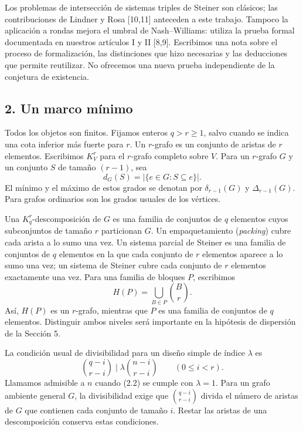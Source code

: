 \documentclass[spanish,11pt,a4paper]{article}
\begin{document}
Los problemas de intersección de sistemas triples de Steiner son clásicos; las contribuciones de Lindner y Rosa {[}10,11{]} anteceden a este trabajo. Tampoco la aplicación a rondas mejora el umbral de Nash--Williams: utiliza la prueba formal documentada en nuestros artículos I y II {[}8,9{]}. Escribimos una nota sobre el proceso de formalización, las distinciones que hizo necesarias y las deducciones que permite reutilizar. No ofrecemos una nueva prueba independiente de la conjetura de existencia.

\subsection{2. Un marco mínimo}\label{un-marco-muxednimo}

Todos los objetos son finitos. Fijamos enteros \(q>r\ge1\), salvo cuando se indica una cota inferior más fuerte para \(r\). Un \(r\)-grafo es un conjunto de aristas de \(r\) elementos. Escribimos \(K_V^r\) para el \(r\)-grafo completo sobre \(V\). Para un \(r\)-grafo \(G\) y un conjunto \(S\) de tamaño \((r-1)\), sea \[d_G(S)=|\{e\in G:S\subseteq e\}|.\] El mínimo y el máximo de estos grados se denotan por \(\delta_{r-1}(G)\) y \(\Delta_{r-1}(G)\). Para grafos ordinarios son los grados usuales de los vértices.

Una \(K_q^r\)-descomposición de \(G\) es una familia de conjuntos de \(q\) elementos cuyos subconjuntos de tamaño \(r\) particionan \(G\). Un empaquetamiento (\emph{packing}) cubre cada arista a lo sumo una vez. Un sistema parcial de Steiner es una familia de conjuntos de \(q\) elementos en la que cada conjunto de \(r\) elementos aparece a lo sumo una vez; un sistema de Steiner cubre cada conjunto de \(r\) elementos exactamente una vez. Para una familia de bloques \(P\), escribimos \[H(P)=\bigcup_{B\in P}\binom{B}{r}.
\tag{2.1}\] Así, \(H(P)\) es un \(r\)-grafo, mientras que \(P\) es una familia de conjuntos de \(q\) elementos. Distinguir ambos niveles será importante en la hipótesis de dispersión de la Sección 5.

La condición usual de divisibilidad para un diseño simple de índice \(\lambda\) es \[\binom{q-i}{r-i}\mid\lambda\binom{n-i}{r-i}
\qquad(0\le i<r).
\tag{2.2}\] Llamamos admisible a \(n\) cuando (2.2) se cumple con \(\lambda=1\). Para un grafo ambiente general \(G\), la divisibilidad exige que \(\binom{q-i}{r-i}\) divida el número de aristas de \(G\) que contienen cada conjunto de tamaño \(i\). Restar las aristas de una descomposición conserva estas condiciones.
\end{document}
